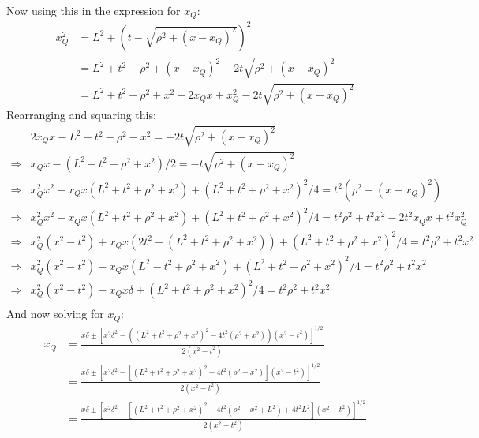 \documentclass[12pt,a4]{article}
\begin{document}
\begin{enumerate}
\begin{enumerate}
        Now using this in the expression for $x_Q$:
        \begin{align*}
          x_Q^2 &= L^2 + \left(t - \sqrt{\rho^2 + (x - x_Q)^2}\right)^2\\
                &= L^2 + t^2 + \rho^2 + (x - x_Q)^2 - 2 t \sqrt{\rho^2 + (x - x_Q)^2}\\
                &= L^2 + t^2 + \rho^2 + x^2 - 2x_Qx + x_Q^2 - 2 t \sqrt{\rho^2 + (x - x_Q)^2}
        \end{align*}
        Rearranging and squaring this:
        \begin{align*}
                      & 2x_Qx - L^2 - t^2 - \rho^2 - x^2 = -2 t \sqrt{\rho^2 + (x - x_Q)^2}\\
          \Rightarrow & x_Qx - (L^2 + t^2 + \rho^2 + x^2)/2 = - t \sqrt{\rho^2 + (x - x_Q)^2}\\
          \Rightarrow & x_Q^2x^2 - x_Qx (L^2 + t^2 + \rho^2 + x^2) + (L^2 + t^2 + \rho^2 + x^2)^2/4 = t^2 (\rho^2 + (x - x_Q)^2)\\
          \Rightarrow & x_Q^2x^2 - x_Qx (L^2 + t^2 + \rho^2 + x^2) + (L^2 + t^2 + \rho^2 + x^2)^2/4 = t^2 \rho^2 + t^2 x^2 - 2 t^2x_Qx + t^2x_Q^2\\
          \Rightarrow & x_Q^2(x^2 - t^2) + x_Qx (2t^2 - (L^2 + t^2 + \rho^2 + x^2)) + (L^2 + t^2 + \rho^2 + x^2)^2/4 = t^2 \rho^2 + t^2 x^2 \\
          \Rightarrow & x_Q^2(x^2 - t^2) - x_Qx (L^2 - t^2 + \rho^2 + x^2) + (L^2 + t^2 + \rho^2 + x^2)^2/4 = t^2 \rho^2 + t^2 x^2 \\
          \Rightarrow & x_Q^2(x^2 - t^2) - x_Qx \delta + (L^2 + t^2 + \rho^2 + x^2)^2/4 = t^2 \rho^2 + t^2 x^2 \\
        \end{align*}
        And now solving for $x_Q$:
        \begin{align*}
          x_Q   &= \frac{x\delta \pm \left[x^2\delta^2 - ((L^2 + t^2 + \rho^2 + x^2)^2 - 4 t^2 ( \rho^2 + x^2)) (x^2 - t^2)\right]^{1/2}}{2(x^2 - t^2)}\\
                &= \frac{x\delta \pm \left[x^2\delta^2 - \left[(L^2 + t^2 + \rho^2 + x^2)^2 - 4 t^2 ( \rho^2 + x^2)\right] (x^2 - t^2)\right]^{1/2}}{2(x^2 - t^2)}\\
                &= \frac{x\delta \pm \left[x^2\delta^2 - \left[(L^2 + t^2 + \rho^2 + x^2)^2 - 4 t^2 (\rho^2 + x^2 + L^2) + 4t^2L^2\right] (x^2 - t^2)\right]^{1/2}}{2(x^2 - t^2)}\\

\end{align*}
\end{enumerate}
\end{enumerate}
\end{document}
